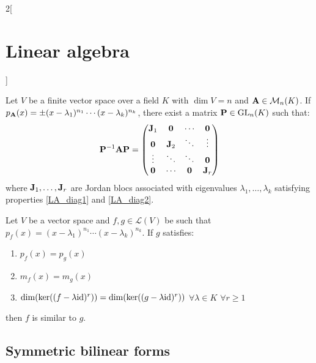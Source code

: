\documentclass[../../../main.tex]{subfiles}
\begin{document}
\begin{multicols}{2}[\section{Linear algebra}]
\begin{prop}
\begin{enumerate}
    \end{enumerate}
  \end{prop}
  \begin{prop}
    Let $V$ be a finite vector space over a field $K$ with $\dim V=n$ and $\vb{A}\in\mathcal{M}_n(K)$. If $p_{\vb{A}}(x)=\pm(x-\lambda_1)^{n_1}\cdots(x-\lambda_k)^{n_k}$, there exist a matrix $\vb{P}\in\mathrm{GL}_n(K)$ such that:
    $$\vb{P}^{-1}\vb{A}\vb{P}=
      \begin{pmatrix}
        \vb{J}_1 & \vb{0}   & \cdots        & \vb{0}   \\
        \vb{0}   & \vb{J}_2 & \ddots        & \vdots          \\
        \vdots          & \ddots          & \ddots        & \vb{0}   \\
        \vb{0}   & \cdots          & \vb{0} & \vb{J}_r \\
      \end{pmatrix}
    $$
    where $\vb{J}_1,\ldots,\vb{J}_r$ are Jordan blocs associated with eigenvalues $\lambda_1,\ldots,\lambda_k$ satisfying properties \ref{LA_diag1} and \ref{LA_diag2}.
  \end{prop}
  \begin{theorem}
    Let $V$ be a vector space and $f,g\in\mathcal{L}(V)$ be such that $p_f(x)=(x-\lambda_1)^{n_1}\cdots(x-\lambda_k)^{n_k}$. If $g$ satisfies:
    \begin{enumerate}
      \item $p_f(x)=p_g(x)$
      \item $m_f(x)=m_g(x)$
      \item $\dim(\ker((f-\lambda \mathrm{id})^r))=\dim(\ker((g-\lambda \mathrm{id})^r))$ $\forall\lambda\in K$ $\forall r\geq 1$
    \end{enumerate}
    then $f$ is similar to $g$.
  \end{theorem}
  \subsection{Symmetric bilinear forms}

\end{multicols}
\end{document}
